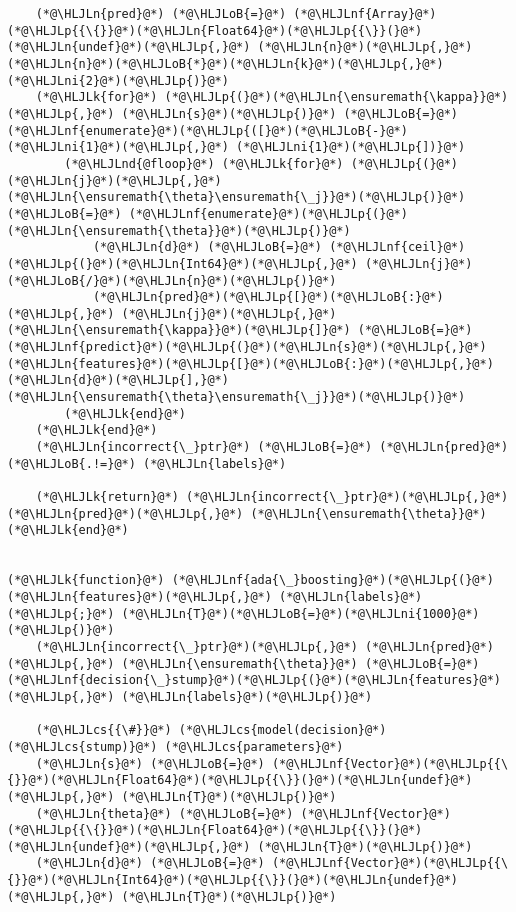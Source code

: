 \documentclass[12pt,a4paper]{article}
\newcommand{\HLJLk}[1]{\textcolor[RGB]{148,91,176}{\textbf{#1}}}
\newcommand{\HLJLn}[1]{#1}
\newcommand{\HLJLnd}[1]{\textcolor[RGB]{214,102,97}{#1}}
\newcommand{\HLJLnf}[1]{\textcolor[RGB]{66,102,213}{#1}}
\newcommand{\HLJLni}[1]{\textcolor[RGB]{59,151,46}{#1}}
\newcommand{\HLJLoB}[1]{\textcolor[RGB]{102,102,102}{\textbf{#1}}}
\newcommand{\HLJLp}[1]{#1}
\newcommand{\HLJLcs}[1]{\textcolor[RGB]{153,153,119}{\textit{#1}}}
\begin{document}
\begin{lstlisting}
    (*@\HLJLn{pred}@*) (*@\HLJLoB{=}@*) (*@\HLJLnf{Array}@*)(*@\HLJLp{{\{}}@*)(*@\HLJLn{Float64}@*)(*@\HLJLp{{\}}(}@*)(*@\HLJLn{undef}@*)(*@\HLJLp{,}@*) (*@\HLJLn{n}@*)(*@\HLJLp{,}@*) (*@\HLJLn{n}@*)(*@\HLJLoB{*}@*)(*@\HLJLn{k}@*)(*@\HLJLp{,}@*) (*@\HLJLni{2}@*)(*@\HLJLp{)}@*)
    (*@\HLJLk{for}@*) (*@\HLJLp{(}@*)(*@\HLJLn{\ensuremath{\kappa}}@*)(*@\HLJLp{,}@*) (*@\HLJLn{s}@*)(*@\HLJLp{)}@*) (*@\HLJLoB{=}@*) (*@\HLJLnf{enumerate}@*)(*@\HLJLp{([}@*)(*@\HLJLoB{-}@*)(*@\HLJLni{1}@*)(*@\HLJLp{,}@*) (*@\HLJLni{1}@*)(*@\HLJLp{])}@*)
        (*@\HLJLnd{@floop}@*) (*@\HLJLk{for}@*) (*@\HLJLp{(}@*)(*@\HLJLn{j}@*)(*@\HLJLp{,}@*) (*@\HLJLn{\ensuremath{\theta}\ensuremath{\_j}}@*)(*@\HLJLp{)}@*) (*@\HLJLoB{=}@*) (*@\HLJLnf{enumerate}@*)(*@\HLJLp{(}@*)(*@\HLJLn{\ensuremath{\theta}}@*)(*@\HLJLp{)}@*)
            (*@\HLJLn{d}@*) (*@\HLJLoB{=}@*) (*@\HLJLnf{ceil}@*)(*@\HLJLp{(}@*)(*@\HLJLn{Int64}@*)(*@\HLJLp{,}@*) (*@\HLJLn{j}@*)(*@\HLJLoB{/}@*)(*@\HLJLn{n}@*)(*@\HLJLp{)}@*)
            (*@\HLJLn{pred}@*)(*@\HLJLp{[}@*)(*@\HLJLoB{:}@*)(*@\HLJLp{,}@*) (*@\HLJLn{j}@*)(*@\HLJLp{,}@*) (*@\HLJLn{\ensuremath{\kappa}}@*)(*@\HLJLp{]}@*) (*@\HLJLoB{=}@*) (*@\HLJLnf{predict}@*)(*@\HLJLp{(}@*)(*@\HLJLn{s}@*)(*@\HLJLp{,}@*) (*@\HLJLn{features}@*)(*@\HLJLp{[}@*)(*@\HLJLoB{:}@*)(*@\HLJLp{,}@*) (*@\HLJLn{d}@*)(*@\HLJLp{],}@*) (*@\HLJLn{\ensuremath{\theta}\ensuremath{\_j}}@*)(*@\HLJLp{)}@*)
        (*@\HLJLk{end}@*) 
    (*@\HLJLk{end}@*)
    (*@\HLJLn{incorrect{\_}ptr}@*) (*@\HLJLoB{=}@*) (*@\HLJLn{pred}@*) (*@\HLJLoB{.!=}@*) (*@\HLJLn{labels}@*)

    (*@\HLJLk{return}@*) (*@\HLJLn{incorrect{\_}ptr}@*)(*@\HLJLp{,}@*) (*@\HLJLn{pred}@*)(*@\HLJLp{,}@*) (*@\HLJLn{\ensuremath{\theta}}@*)
(*@\HLJLk{end}@*)


(*@\HLJLk{function}@*) (*@\HLJLnf{ada{\_}boosting}@*)(*@\HLJLp{(}@*)(*@\HLJLn{features}@*)(*@\HLJLp{,}@*) (*@\HLJLn{labels}@*)(*@\HLJLp{;}@*) (*@\HLJLn{T}@*)(*@\HLJLoB{=}@*)(*@\HLJLni{1000}@*)(*@\HLJLp{)}@*)
    (*@\HLJLn{incorrect{\_}ptr}@*)(*@\HLJLp{,}@*) (*@\HLJLn{pred}@*)(*@\HLJLp{,}@*) (*@\HLJLn{\ensuremath{\theta}}@*) (*@\HLJLoB{=}@*) (*@\HLJLnf{decision{\_}stump}@*)(*@\HLJLp{(}@*)(*@\HLJLn{features}@*)(*@\HLJLp{,}@*) (*@\HLJLn{labels}@*)(*@\HLJLp{)}@*)
    
    (*@\HLJLcs{{\#}}@*) (*@\HLJLcs{model(decision}@*) (*@\HLJLcs{stump)}@*) (*@\HLJLcs{parameters}@*)
    (*@\HLJLn{s}@*) (*@\HLJLoB{=}@*) (*@\HLJLnf{Vector}@*)(*@\HLJLp{{\{}}@*)(*@\HLJLn{Float64}@*)(*@\HLJLp{{\}}(}@*)(*@\HLJLn{undef}@*)(*@\HLJLp{,}@*) (*@\HLJLn{T}@*)(*@\HLJLp{)}@*)
    (*@\HLJLn{theta}@*) (*@\HLJLoB{=}@*) (*@\HLJLnf{Vector}@*)(*@\HLJLp{{\{}}@*)(*@\HLJLn{Float64}@*)(*@\HLJLp{{\}}(}@*)(*@\HLJLn{undef}@*)(*@\HLJLp{,}@*) (*@\HLJLn{T}@*)(*@\HLJLp{)}@*)
    (*@\HLJLn{d}@*) (*@\HLJLoB{=}@*) (*@\HLJLnf{Vector}@*)(*@\HLJLp{{\{}}@*)(*@\HLJLn{Int64}@*)(*@\HLJLp{{\}}(}@*)(*@\HLJLn{undef}@*)(*@\HLJLp{,}@*) (*@\HLJLn{T}@*)(*@\HLJLp{)}@*)


\end{lstlisting}
\end{document}
